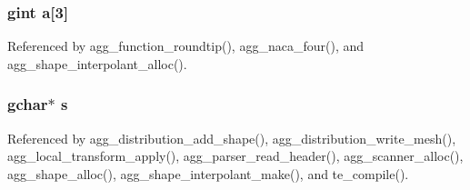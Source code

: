 \subsubsection[{a}]{\setlength{\rightskip}{0pt plus 5cm}gint a[3]}\label{distribution_8c_adf5f7ebbd555bff55d15911169d78fa3}


Referenced by agg\+\_\+function\+\_\+roundtip(), agg\+\_\+naca\+\_\+four(), and agg\+\_\+shape\+\_\+interpolant\+\_\+alloc().

\subsubsection[{s}]{\setlength{\rightskip}{0pt plus 5cm}gchar$\ast$ s}\label{distribution_8c_ae9fc68f659b20abf6455ad7212577311}


Referenced by agg\+\_\+distribution\+\_\+add\+\_\+shape(), agg\+\_\+distribution\+\_\+write\+\_\+mesh(), agg\+\_\+local\+\_\+transform\+\_\+apply(), agg\+\_\+parser\+\_\+read\+\_\+header(), agg\+\_\+scanner\+\_\+alloc(), agg\+\_\+shape\+\_\+alloc(), agg\+\_\+shape\+\_\+interpolant\+\_\+make(), and te\+\_\+compile().

